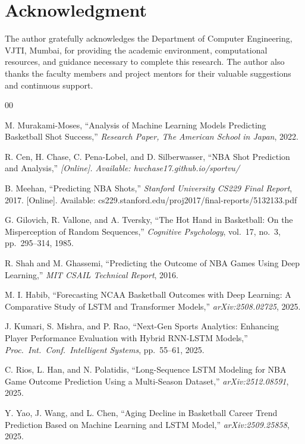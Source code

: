 \documentclass[conference]{IEEEtran}
\begin{document}
\section*{Acknowledgment}
The author gratefully acknowledges the Department of Computer
Engineering, VJTI, Mumbai, for providing the academic environment,
computational resources, and guidance necessary to complete this
research.  The author also thanks the faculty members and project
mentors for their valuable suggestions and continuous support.

\begin{thebibliography}{00}

M. Murakami-Moses,
``Analysis of Machine Learning Models Predicting Basketball Shot Success,''
\textit{Research Paper, The American School in Japan}, 2022.

R. Cen, H. Chase, C. Pena-Lobel, and D. Silberwasser,
``NBA Shot Prediction and Analysis,''
\textit{[Online]. Available: hwchase17.github.io/sportvu/}

B. Meehan,
``Predicting NBA Shots,''
\textit{Stanford University CS229 Final Report}, 2017.
[Online]. Available: cs229.stanford.edu/proj2017/final-reports/5132133.pdf

G. Gilovich, R. Vallone, and A. Tversky,
``The Hot Hand in Basketball: On the Misperception of Random Sequences,''
\textit{Cognitive Psychology}, vol.~17, no.~3, pp.~295--314, 1985.

R. Shah and M. Ghassemi,
``Predicting the Outcome of NBA Games Using Deep Learning,''
\textit{MIT CSAIL Technical Report}, 2016.

M. I. Habib,
``Forecasting NCAA Basketball Outcomes with Deep Learning: A Comparative
Study of LSTM and Transformer Models,''
\textit{arXiv:2508.02725}, 2025.

J. Kumari, S. Mishra, and P. Rao,
``Next-Gen Sports Analytics: Enhancing Player Performance Evaluation with
Hybrid RNN-LSTM Models,''
\textit{Proc.\ Int.\ Conf.\ Intelligent Systems}, pp.~55--61, 2025.

C. Rios, L. Han, and N. Polatidis,
``Long-Sequence LSTM Modeling for NBA Game Outcome Prediction Using a
Multi-Season Dataset,''
\textit{arXiv:2512.08591}, 2025.

Y. Yao, J. Wang, and L. Chen,
``Aging Decline in Basketball Career Trend Prediction Based on Machine
Learning and LSTM Model,''
\textit{arXiv:2509.25858}, 2025.


\end{thebibliography}
\end{document}
